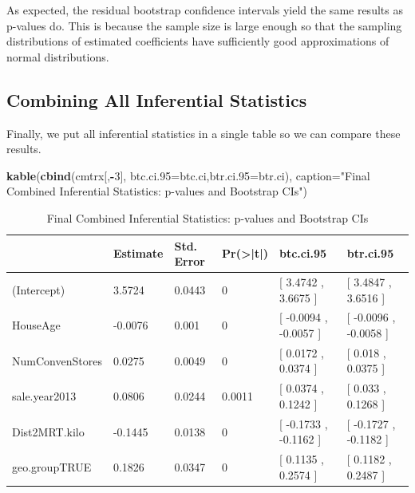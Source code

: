 \documentclass[
]{book}
\newenvironment{Shaded}{\begin{snugshade}}{\end{snugshade}}
\newcommand{\AttributeTok}[1]{\textcolor[rgb]{0.13,0.29,0.53}{#1}}
\newcommand{\DecValTok}[1]{\textcolor[rgb]{0.00,0.00,0.81}{#1}}
\newcommand{\FunctionTok}[1]{\textcolor[rgb]{0.13,0.29,0.53}{\textbf{#1}}}
\newcommand{\NormalTok}[1]{#1}
\newcommand{\SpecialCharTok}[1]{\textcolor[rgb]{0.81,0.36,0.00}{\textbf{#1}}}
\newcommand{\StringTok}[1]{\textcolor[rgb]{0.31,0.60,0.02}{#1}}
\begin{document}
As expected, the residual bootstrap confidence intervals yield the same results as p-values do. This is because the sample size is large enough so that the sampling distributions of estimated coefficients have sufficiently good approximations of normal distributions.

\hypertarget{combining-all-inferential-statistics}{%
\subsection{Combining All Inferential Statistics}\label{combining-all-inferential-statistics}}

Finally, we put all inferential statistics in a single table so we can compare these results.

\begin{Shaded}
\begin{Highlighting}[]
\FunctionTok{kable}\NormalTok{(}\FunctionTok{cbind}\NormalTok{(cmtrx[,}\SpecialCharTok{{-}}\DecValTok{3}\NormalTok{], }\AttributeTok{btc.ci.95=}\NormalTok{btc.ci,}\AttributeTok{btr.ci.95=}\NormalTok{btr.ci), }
      \AttributeTok{caption=}\StringTok{"Final Combined Inferential Statistics: p{-}values and Bootstrap CIs"}\NormalTok{)}
\end{Highlighting}
\end{Shaded}

\begin{table}

\caption{\label{tab:unnamed-chunk-102}Final Combined Inferential Statistics: p-values and Bootstrap CIs}
\centering
\begin{tabular}[t]{l|l|l|l|l|l}
\hline
  & Estimate & Std. Error & Pr(>|t|) & btc.ci.95 & btr.ci.95\\
\hline
(Intercept) & 3.5724 & 0.0443 & 0 & [ 3.4742 ,  3.6675 ] & [ 3.4847 ,  3.6516 ]\\
\hline
HouseAge & -0.0076 & 0.001 & 0 & [ -0.0094 ,  -0.0057 ] & [ -0.0096 ,  -0.0058 ]\\
\hline
NumConvenStores & 0.0275 & 0.0049 & 0 & [ 0.0172 ,  0.0374 ] & [ 0.018 ,  0.0375 ]\\
\hline
sale.year2013 & 0.0806 & 0.0244 & 0.0011 & [ 0.0374 ,  0.1242 ] & [ 0.033 ,  0.1268 ]\\
\hline
Dist2MRT.kilo & -0.1445 & 0.0138 & 0 & [ -0.1733 ,  -0.1162 ] & [ -0.1727 ,  -0.1182 ]\\
\hline
geo.groupTRUE & 0.1826 & 0.0347 & 0 & [ 0.1135 ,  0.2574 ] & [ 0.1182 ,  0.2487 ]\\
\hline
\end{tabular}
\end{table}
\end{document}
